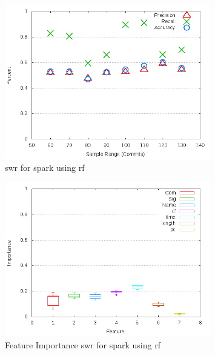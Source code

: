 \clearpage
\begin{figure}[!t]
\centering
\includegraphics[width=0.8\textwidth]{images/rf/test_1/spark_sample_range.png}
\caption{\gls{swr} for spark using \gls{rf}}
\label{fig:test_1_spark_rf}
\end{figure}

\begin{figure}[!t]
\centering
\includegraphics[width=0.8\textwidth]{images/rf/test_1/spark_importance.png}
\caption{Feature Importance \gls{swr} for spark using \gls{rf}}
\label{fig:test_1_spark_rf_importance}
\end{figure}

